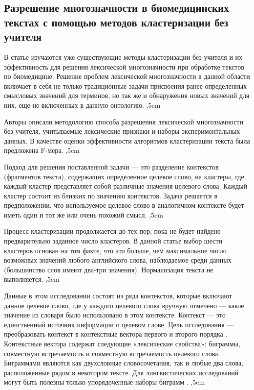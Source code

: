 \documentclass{article}
\begin{document}
\begin{articletext}
\section{Разрешение многозначности в биомедицинских текстах с помощью методов кластеризации без учителя}

\begin{flushright}
\end{flushright}

В статье \cite{Savova 2005} изучаются уже существующие методы кластеризации без учителя и их эффективность для решения лексической многозначности при обработке текстов по биомедицине. Решение проблем лексической многозначности в данной области включает в себя не только традиционные задачи присвоения ранее определенных смысловых значений для терминов, но так же и обнаружения новых значений для них, еще не включенных в данную онтологию.
,5cm

Авторы описали методологию способа разрешения лексической многозначности без учителя, учитываемые лексические признаки и наборы экспериментальных данных. В качестве оценки эффективности алгоритмов кластеризации текста была предложена F-мера. 
,5cm

Подход для решения поставленной задачи --- это разделение контекстов (фрагментов текста), содержащих определенное целевое слово, на кластеры, где каждый кластер представляет собой различные значения целевого слова. Каждый кластер состоит из близких по значению контекстов. Задача решается в предположении, что используемое целевое слово в аналогичном контексте будет иметь один и тот же или очень похожий смысл. 
,5cm

Процесс кластеризации продолжается до тех пор, пока не будет найдено предварительно заданное число кластеров. В данной статье выбор шести кластеров основан на том факте, что это больше, чем максимальное число возможных значений любого английского слова, наблюдаемое среди данных (большинство слов имеют два-три значения). Нормализация текста не выполняется.
,5cm

Данные в этом исследовании состоят из ряда контекстов, которые включают данное целевое слово, где у каждого целевого слова вручную отмечено --- какое значение из словаря было использовано в этом контексте. Контекст --- это единственный источник информации о целевом слове. Цель исследования --- преобразовать контекст в контекстные вектора первого и второго порядка \cite{epr:website}. Контекстные вектора содержат следующие «лексические свойства»: биграммы, совместную встречаемость и совместную встречаемость целевого слова. Биграммами являются как двухсловные словосочетания, так и любые два слова, расположенные рядом в некотором тексте. Для лингвистических исследований могут быть полезны только упорядоченные наборы биграмм \cite{Averin 2006}. 
,5cm


\end{articletext}
\end{document}
